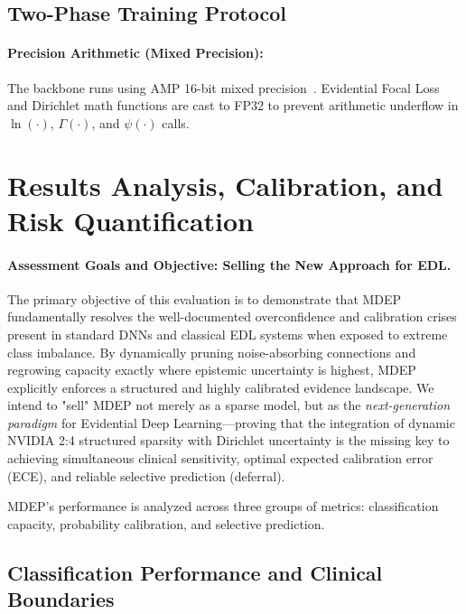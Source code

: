 \documentclass[letterpaper]{article} %
\begin{document}
\subsection{Two-Phase Training Protocol}\label{subsec:two_phase}



\paragraph{Precision Arithmetic (Mixed Precision):}
The backbone runs using AMP 16-bit mixed precision~\cite{micikevicius2018mixed}. Evidential Focal Loss and Dirichlet math functions are cast to FP32 to prevent arithmetic underflow in $\ln(\cdot)$, $\Gamma(\cdot)$, and $\psi(\cdot)$ calls.

\section{Results Analysis, Calibration, and Risk Quantification}\label{sec:results}

\paragraph{Assessment Goals and Objective: Selling the New Approach for EDL.} 
The primary objective of this evaluation is to demonstrate that MDEP fundamentally resolves the well-documented overconfidence and calibration crises present in standard DNNs and classical EDL systems when exposed to extreme class imbalance. By dynamically pruning noise-absorbing connections and regrowing capacity exactly where epistemic uncertainty is highest, MDEP explicitly enforces a structured and highly calibrated evidence landscape. We intend to "sell" MDEP not merely as a sparse model, but as the \textit{next-generation paradigm} for Evidential Deep Learning---proving that the integration of dynamic NVIDIA 2:4 structured sparsity with Dirichlet uncertainty is the missing key to achieving simultaneous clinical sensitivity, optimal expected calibration error (ECE), and reliable selective prediction (deferral).

MDEP's performance is analyzed across three groups of metrics: classification capacity, probability calibration, and selective prediction.

\subsection{Classification Performance and Clinical Boundaries}\label{subsec:classification}
\end{document}
